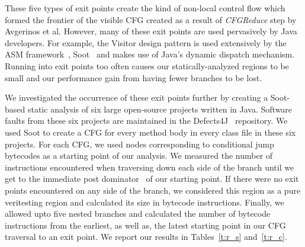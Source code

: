 These five types of exit points create the kind of non-local control flow which formed the frontier of the visible CFG created as a result of \textit{CFGReduce} step by Avgerinos et al.
%
However, many of these exit points are used pervasively by Java developers.
%
For example, the Visitor design pattern is used extensively by the ASM framework~\cite{asm}, Soot~\cite{soot} and makes use of Java\rq s dynamic dispatch mechanism.
%
Running into exit points too often causes our statically-analyzed regions to be small and our performance gain from having fewer branches to be lost.

We investigated the occurrence of these exit points further by creating a Soot-based static analysis of six large open-source projects written in Java.
%
Software faults from these six projects are maintained in the Defects4J~\cite{defects4j} repository.
%
We used Soot to create a CFG for every method body in every class file in these six projects.
%
For each CFG, we used nodes corresponding to conditional jump bytecodes as a starting point of our analysis.
%
We measured the number of instructions encountered when traversing down each side of the branch until we get to the immediate post dominator~\cite{dragon-book} of our starting point.
%
If there were no exit points encountered on any side of the branch, we considered this region as a pure veritesting region and calculated its size in bytecode instructions.
%
Finally, we allowed upto five nested branches and calculated the number of bytecode instructions from the earliest, as well as, the latest starting point in our CFG traversal to an exit point.
%
We report our results in Tables~\ref{t:r_s} and~\ref{t:r_c}.
%
